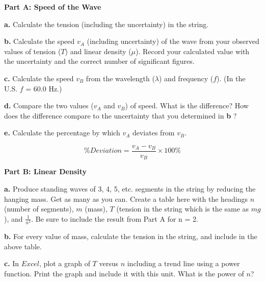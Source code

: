 \textbf{Part A: Speed of the Wave }

\textbf{a. } Calculate the tension (including the uncertainty) in the string.

\vspace{3cm}

\newpage

\textbf{b. } Calculate the speed $v_A$ (including uncertainty) of the wave from your observed values of tension
($T$) and linear density ($\mu $). Record your calculated value with the uncertainty and the correct number of significant
figures.


\vspace{4cm}

\textbf{c. } Calculate the speed $v_B$ from the wavelength ($\lambda $) and frequency ($f$). (In the U.S. $f$ = 60.0 Hz.)

\vspace{4cm}

\textbf{d. } Compare the two values ($v_A$ and $v_B$) of speed. What is the difference? How does the difference compare
to the uncertainty that you determined in \textbf{b }?

\vspace{4cm}

\textbf{e. } Calculate the percentage by which $v_A$ deviates from $v_B$.

\begin{equation}
\% Deviation =\frac {v_A - v_B}{v_B} \times 100\%
\end{equation}

\vspace{3cm}

\newpage

\textbf{Part B: Linear Density}

\textbf{a. } Produce standing waves of 3, 4, 5, etc. segments in the string by reducing the hanging mass. Get as many as you can. Create a table here with the headings $n$ (number of segments), $m$ (mass), $T$ (tension in the string which is the same as $mg$), and $\frac{1}{n^2}$. Be sure to include the result from Part A for n = 2.

\vspace{6cm}

\textbf{b. } For every value of mass, calculate the tension in the string, and include in the above table.

\textbf{c. } In $Excel$, plot a graph of $T$ versus $n$ including a trend line 
using a power function. Print the graph and include it with this unit. What is 
the power of $n$?
\vspace{20mm}

